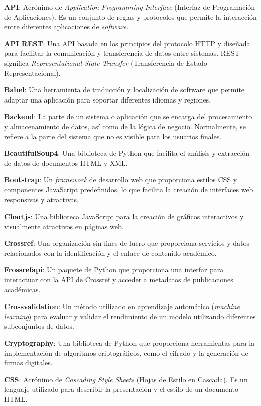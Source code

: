 
\textbf{API}: Acrónimo de \textit{Application Programming Interface} (Interfaz de Programación de Aplicaciones). Es un conjunto de reglas y protocolos que permite la interacción entre diferentes aplicaciones de \textit{software}.

\textbf{API REST}: Una API basada en los principios del protocolo HTTP y diseñada para facilitar la comunicación y transferencia de datos entre sistemas. REST significa \textit{Representational State Transfer} (Transferencia de Estado Representacional).

\textbf{Babel}: Una herramienta de traducción y localización de software que permite adaptar una aplicación para soportar diferentes idiomas y regiones.

\textbf{Backend}: La parte de un sistema o aplicación que se encarga del procesamiento y almacenamiento de datos, así como de la lógica de negocio. Normalmente, se refiere a la parte del sistema que no es visible para los usuarios finales.

\textbf{BeautifulSoup4}: Una biblioteca de Python que facilita el análisis y extracción de datos de documentos HTML y XML.

\textbf{Bootstrap}: Un \textit{framework} de desarrollo web que proporciona estilos CSS y componentes JavaScript predefinidos, lo que facilita la creación de interfaces web responsivas y atractivas.

\textbf{Chartjs}: Una biblioteca JavaScript para la creación de gráficos interactivos y visualmente atractivos en páginas web.

\textbf{Crossref}: Una organización sin fines de lucro que proporciona servicios y datos relacionados con la identificación y el enlace de contenido académico.

\textbf{Frossrefapi}: Un paquete de Python que proporciona una interfaz para interactuar con la API de Crossref y acceder a metadatos de publicaciones académicas.

\textbf{Crossvalidation}: Un método utilizado en aprendizaje automático (\textit{machine learning}) para evaluar y validar el rendimiento de un modelo utilizando diferentes subconjuntos de datos.

\textbf{Cryptography}: Una biblioteca de Python que proporciona herramientas para la implementación de algoritmos criptográficos, como el cifrado y la generación de firmas digitales.

\textbf{CSS}: Acrónimo de \textit{Cascading Style Sheets} (Hojas de Estilo en Cascada). Es un lenguaje utilizado para describir la presentación y el estilo de un documento HTML.


